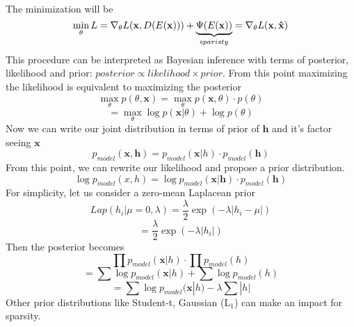 \documentclass[11pt,twocolumn]{article}
\begin{document}
\\
The minimization will be
$$\min\limits_{\theta} L = \nabla_\theta L(\mathbf{x}, D(E(\mathbf{x}))) + \underbrace{\Psi(E(\mathbf{x}))}_{\text sparisty} =\nabla_\theta L(\mathbf{x}, \mathbf{\hat{x}}) $$
This procedure can be interpreted as Bayesian inference with terms of posterior, likelihood and prior: $posterior \propto likelihood \times prior$. From this point maximizing the likelihood is equivalent to maximizing the posterior
$$\max\limits_{\theta} p(\theta,\mathbf{x})=\max\limits_{\theta} p(\mathbf{x},\theta) \cdot p(\theta)$$
$$=\max\limits_{\theta}\log p(\mathbf{x} | \theta) + \log p(\theta)$$ 
Now we can write our joint distribution in terms of prior of $\mathbf{h}$ and it's factor seeing  $\mathbf{x}$ 
$$p_{model}(\mathbf{x},\mathbf{h}) = p_{model}(\mathbf{x}|h) \cdot p_{model}(\mathbf{h})$$
From this point, we can rewrite our likelihood and propose a prior distribution. 
$$\log p_{model}(x,h) = \log p_{model}(\mathbf{x}|\mathbf{h}) \cdot p_{model}(\mathbf{h})$$
For simplicity, let us consider a zero-mean Laplacean prior
$$ Lap(h_i|\mu=0,\lambda) = \frac{\lambda}{2}\exp(-\lambda|h_i - \mu|)$$
$$ = \frac{\lambda}{2}\exp(-\lambda|h_i |)$$
Then the posterior becomes
$$\prod p_{model}(\mathbf{x}|h) \cdot \prod  p_{model}(h)$$
$$= \sum \log p_{model}(\mathbf{x}|h) + \sum \log  p_{model}(h)$$
$$ = \sum \log p_{model}(\mathbf{x}|h) - \lambda \sum |h|$$  
Other prior distributions like Student-t, Gaussian ($\text{L}_1$)  can make an impact for sparsity.
\end{document}
